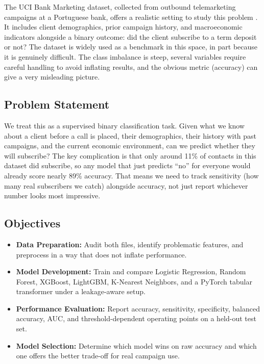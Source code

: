\documentclass[10pt,twocolumn]{article}
\begin{document}
The UCI Bank Marketing dataset, collected from outbound telemarketing campaigns at a Portuguese bank, offers a realistic setting to study this problem \cite{moro2014}. It includes client demographics, prior campaign history, and macroeconomic indicators alongside a binary outcome: did the client subscribe to a term deposit or not? The dataset is widely used as a benchmark in this space, in part because it is genuinely difficult. The class imbalance is steep, several variables require careful handling to avoid inflating results, and the obvious metric (accuracy) can give a very misleading picture.

\subsection{Problem Statement}
We treat this as a supervised binary classification task. Given what we know about a client before a call is placed, their demographics, their history with past campaigns, and the current economic environment, can we predict whether they will subscribe? The key complication is that only around 11\% of contacts in this dataset did subscribe, so any model that just predicts ``no'' for everyone would already score nearly 89\% accuracy. That means we need to track sensitivity (how many real subscribers we catch) alongside accuracy, not just report whichever number looks most impressive.

\subsection{Objectives}
\begin{itemize}
  \item \textbf{Data Preparation:} Audit both files, identify problematic features, and preprocess in a way that does not inflate performance.
  \item \textbf{Model Development:} Train and compare Logistic Regression, Random Forest, XGBoost, LightGBM, K-Nearest Neighbors, and a PyTorch tabular transformer under a leakage-aware setup.
  \item \textbf{Performance Evaluation:} Report accuracy, sensitivity, specificity, balanced accuracy, AUC, and threshold-dependent operating points on a held-out test set.
  \item \textbf{Model Selection:} Determine which model wins on raw accuracy and which one offers the better trade-off for real campaign use.
\end{itemize}
\end{document}
